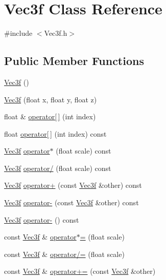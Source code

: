 \hypertarget{class_vec3f}{\section{Vec3f Class Reference}
\label{class_vec3f}
}


{\ttfamily \#include $<$Vec3f.\+h$>$}

\subsection*{Public Member Functions}
\begin{DoxyCompactItemize}
\item 
\hyperlink{class_vec3f_af874d7517d0a628834c6d753aa516325}{Vec3f} ()
\item 
\hyperlink{class_vec3f_ae5a91a93e91ea3310aab46fa477e5269}{Vec3f} (float x, float y, float z)
\item 
float \& \hyperlink{class_vec3f_aa0c04f4b27776d3e5127e97a3e249fc9}{operator\mbox{[}$\,$\mbox{]}} (int index)
\item 
float \hyperlink{class_vec3f_a30e3c40ceada4f98aa5563a785cf2adf}{operator\mbox{[}$\,$\mbox{]}} (int index) const 
\item 
\hyperlink{class_vec3f}{Vec3f} \hyperlink{class_vec3f_a694b7bcc90b2bf2cf2ec676eeac6cb09}{operator$\ast$} (float scale) const 
\item 
\hyperlink{class_vec3f}{Vec3f} \hyperlink{class_vec3f_a759b6e65c71b9d1b664d862cac3a252c}{operator/} (float scale) const 
\item 
\hyperlink{class_vec3f}{Vec3f} \hyperlink{class_vec3f_a30acce964c8e0e55bae302ede47cb011}{operator+} (const \hyperlink{class_vec3f}{Vec3f} \&other) const 
\item 
\hyperlink{class_vec3f}{Vec3f} \hyperlink{class_vec3f_aa8e6138ebde4aaa3d273ea59a9515c89}{operator-\/} (const \hyperlink{class_vec3f}{Vec3f} \&other) const 
\item 
\hyperlink{class_vec3f}{Vec3f} \hyperlink{class_vec3f_afd50eb766e7e4b6c133b9161228221bf}{operator-\/} () const 
\item 
const \hyperlink{class_vec3f}{Vec3f} \& \hyperlink{class_vec3f_a6c115f8281eb38d174361016f16fbc34}{operator$\ast$=} (float scale)
\item 
const \hyperlink{class_vec3f}{Vec3f} \& \hyperlink{class_vec3f_a0e754b5fb48f8f9365728205f806a6b7}{operator/=} (float scale)
\item 
const \hyperlink{class_vec3f}{Vec3f} \& \hyperlink{class_vec3f_a141380cc69cc14deb7dfc7219627bad2}{operator+=} (const \hyperlink{class_vec3f}{Vec3f} \&other)

\end{DoxyCompactItemize}
